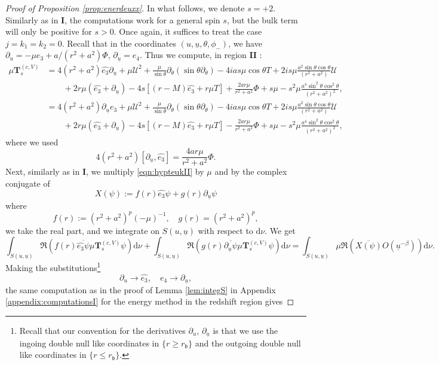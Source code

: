 \documentclass[reqno]{amsart}
\numberwithin{equation}{section}
\newcommand{\intS}{\int_{S(u,\ubar)}}
\newcommand{\Real}{\mathfrak{R}}
\newcommand{\ubar}{{\underline{u}}}
\newcommand{\dee}{\mathrm{d}}
\newcommand{\teuk}{\mathbf{T}}
\newcommand{\ethat}{\widehat{e_3}}
\newcommand{\un}{\mathbf{I}}
\newcommand{\rb}{r_\mathfrak{b}}
\theoremstyle{plain}
\theoremstyle{definition}
\theoremstyle{remark}
\numberwithin{equation}{section}
\begin{document}
\begin{proof}[Proof of Proposition \ref{prop:enerdeuxx}]
In what follows, we denote $s=+2$. Similarly as in $\un$, the computations work for a general spin $s$, but the bulk term will only be positive for $s>0$. Once again, it suffices to treat the case $j=k_1=k_2=0$. Recall that in the coordinates $(u,\ubar,\theta,\phi_{-})$, we have $\partial_u=-\mu e_3+a/(r^2+a^2)\Phi$, $\partial_\ubar=e_4$. Thus we compute, in region $\mathbf{II}$ :
\begin{align}
    \mu\teuk_s^{(c,V)}&=4(r^2+a^2)\widehat{e_3}\partial_\ubar+ \mu \mathcal{U}^2+\frac{\mu}{\sin\theta}\partial_\theta(\sin\theta\partial_\theta)-4 ias\mu\cos\theta T+2is\mu \frac{a^2\sin\theta\cos\theta}{(r^2+a^2)}\mathcal{U}\nonumber\\
    &\quad\quad+2 r\mu (\widehat{e_3}+\partial_\ubar)-4 s[(r-M)\widehat{e_3}+ r\mu T]+\frac{2ar\mu  }{r^2+a^2}\Phi+ s\mu -s^2\mu\frac{a^4\sin^2\theta\cos^2\theta}{(r^2+a^2)^2},\label{eqn:muteukII1}\\
    &=4(r^2+a^2)\partial_\ubar \widehat{e_3}+ \mu \mathcal{U}^2+\frac{\mu}{\sin\theta}\partial_\theta(\sin\theta\partial_\theta)-4 ias\mu\cos\theta T+2is\mu \frac{a^2\sin\theta\cos\theta}{(r^2+a^2)}\mathcal{U}\nonumber\\
    &\quad\quad+2 r\mu (\widehat{e_3}+\partial_\ubar)-4 s[(r-M)\widehat{e_3}+ r\mu T]-\frac{2ar\mu  }{r^2+a^2}\Phi+ s\mu -s^2\mu\frac{a^4\sin^2\theta\cos^2\theta}{(r^2+a^2)^2},\label{eqn:muteukII2}
\end{align}
where we used 
$$4(r^2+a^2)[\partial_\ubar,\ethat]=\frac{4ar\mu}{r^2+a^2}\Phi.$$
Next, similarly as in $\un$, we multiply \eqref{eqn:hypteukII} by $\mu$ and by the complex conjugate of 
$$X(\psi):=f(r)\widehat{e_3}\psi+g(r)\partial_\ubar\psi$$
where $$f(r):=(r^2+a^2)^p(-\mu)^{-1},\quad g(r)=(r^2+a^2)^p,$$ we take the real part, and we integrate on ${S(u,\ubar)}$ with respect to $\dee\nu$. We get 
$$\intS \Real(f(r)\overline{\widehat{e_3}\psi}\mu\teuk_s^{(c,V)}\psi)\dee\nu+\intS\Real(g(r)\overline{\partial_\ubar\psi}\mu\teuk_s^{(c,V)}\psi)\dee\nu=\intS\mu\Real({\overline{X(\psi)}O(\ubar^{-\beta})})\dee\nu.$$
Making the substitutions\footnote{Recall that our convention for the derivatives $\partial_u$, $\partial_\ubar$ is that we use the ingoing double null like coordinates in $\{r\geq \rb\}$ and the outgoing double null like coordinates in $\{r\leq \rb\}$.} 
$$\partial_u\rightarrow \ethat,\quad e_4\rightarrow \partial_\ubar,$$
the same computation as in the proof of Lemma \ref{lem:integS} in Appendix \ref{appendix:computationsI} for the energy method in the redshift region gives

\end{proof}
\end{document}
